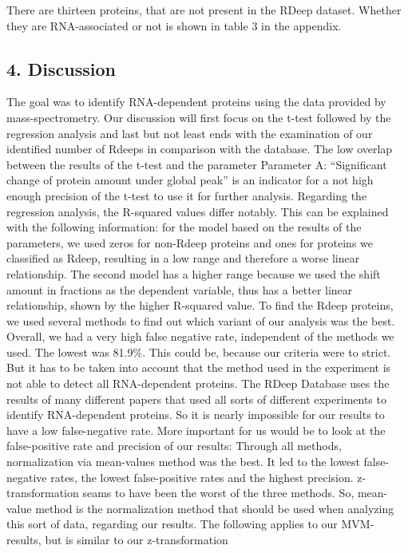 \documentclass[
  12pt,
]{article}
\begin{document}
There are thirteen proteins, that are not present in the RDeep dataset.
Whether they are RNA-associated or not is shown in table 3 in the
appendix.

\hypertarget{discussion}{%
\subsection{4. Discussion}\label{discussion}}

The goal was to identify RNA-dependent proteins using the data provided
by mass-spectrometry. Our discussion will first focus on the t-test
followed by the regression analysis and last but not least ends with the
examination of our identified number of Rdeeps in comparison with the
database. The low overlap between the results of the t-test and the
parameter Parameter A: ``Significant change of protein amount under
global peak'' is an indicator for a not high enough precision of the
t-test to use it for further analysis. Regarding the regression
analysis, the R-squared values differ notably. This can be explained
with the following information: for the model based on the results of
the parameters, we used zeros for non-Rdeep proteins and ones for
proteins we classified as Rdeep, resulting in a low range and therefore
a worse linear relationship. The second model has a higher range because
we used the shift amount in fractions as the dependent variable, thus
has a better linear relationship, shown by the higher R-squared value.
To find the Rdeep proteins, we used several methods to find out which
variant of our analysis was the best. Overall, we had a very high false
negative rate, independent of the methods we used. The lowest was
81.9\%. This could be, because our criteria were to strict. But it has
to be taken into account that the method used in the experiment is not
able to detect all RNA-dependent proteins. The RDeep Database uses the
results of many different papers that used all sorts of different
experiments to identify RNA-dependent proteins. So it is nearly
impossible for our results to have a low false-negative rate. More
important for us would be to look at the false-positive rate and
precision of our results: Through all methods, normalization via
mean-values method was the best. It led to the lowest false-negative
rates, the lowest false-positive rates and the highest precision.
z-transformation seams to have been the worst of the three methods. So,
mean-value method is the normalization method that should be used when
analyzing this sort of data, regarding our results. The following
applies to our MVM-results, but is similar to our z-transformation
\end{document}
